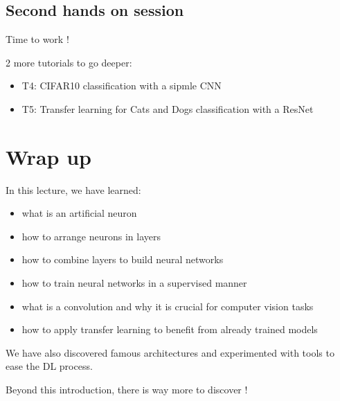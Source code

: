 \documentclass[usenames,dvipsnames]{beamer}
\begin{document}
    \subsection[Hands on]{Second hands on session}
    \begin{frame}{\secname}{\subsecname}
        \begin{center}
            Time to work !
        \end{center}
        2 more tutorials to go deeper:
        \begin{itemize}
            \item T4: CIFAR10 classification with a sipmle CNN
            \item T5: Transfer learning for Cats and Dogs classification with a ResNet
        \end{itemize}
    \end{frame}


\section{Wrap up}
    \begin{frame}{\secname}
        In this lecture, we have learned:
        \begin{itemize}
            \item what is an artificial neuron
            \item how to arrange neurons in layers
            \item how to combine layers to build neural networks
            \item how to train neural networks in a supervised manner
            \item what is a convolution and why it is crucial for computer vision tasks
            \item how to apply transfer learning to benefit from already trained models
        \end{itemize}
        We have also discovered famous architectures and experimented with tools to ease the DL process.
        
        \vspace{0.8em}
        Beyond this introduction, there is way more to discover !
    \end{frame}
    
\end{document}
